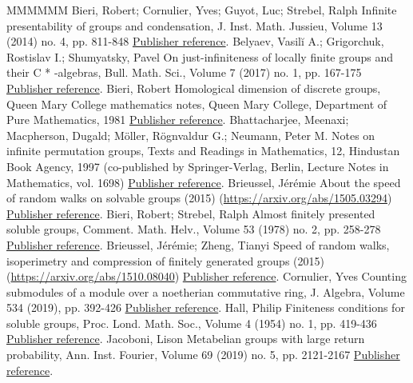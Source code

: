 \begin{thebibliography}{MMMMMM}
 Bieri, Robert; Cornulier, Yves; Guyot, Luc; Strebel, Ralph Infinite presentability of groups and condensation, J. Inst. Math. Jussieu, Volume 13 (2014) no. 4, pp. 811-848 \href{https://ahl.centre-mersenne.org/item/AHL_2020__3__981_0/#BCGS}{Publisher reference}.
 Belyaev, Vasilĭ A.; Grigorchuk, Rostislav I.; Shumyatsky, Pavel On just-infiniteness of locally finite groups and their C * -algebras, Bull. Math. Sci., Volume 7 (2017) no. 1, pp. 167-175 \href{https://ahl.centre-mersenne.org/item/AHL_2020__3__981_0/#BGS}{Publisher reference}.
 Bieri, Robert Homological dimension of discrete groups, Queen Mary College mathematics notes, Queen Mary College, Department of Pure Mathematics, 1981 \href{https://ahl.centre-mersenne.org/item/AHL_2020__3__981_0/#B}{Publisher reference}.
 Bhattacharjee, Meenaxi; Macpherson, Dugald; Möller, Rögnvaldur G.; Neumann, Peter M. Notes on infinite permutation groups, Texts and Readings in Mathematics, 12, Hindustan Book Agency, 1997 (co-published by Springer-Verlag, Berlin, Lecture Notes in Mathematics, vol. 1698) \href{https://ahl.centre-mersenne.org/item/AHL_2020__3__981_0/#perms}{Publisher reference}.
 Brieussel, Jérémie About the speed of random walks on solvable groups (2015) (\url{https://arxiv.org/abs/1505.03294}) \href{https://ahl.centre-mersenne.org/item/AHL_2020__3__981_0/#Brieussel}{Publisher reference}.
 Bieri, Robert; Strebel, Ralph Almost finitely presented soluble groups, Comment. Math. Helv., Volume 53 (1978) no. 2, pp. 258-278 \href{https://ahl.centre-mersenne.org/item/AHL_2020__3__981_0/#BS}{Publisher reference}.
 Brieussel, Jérémie; Zheng, Tianyi Speed of random walks, isoperimetry and compression of finitely generated groups (2015) (\url{https://arxiv.org/abs/1510.08040}) \href{https://ahl.centre-mersenne.org/item/AHL_2020__3__981_0/#BZ}{Publisher reference}.
 Cornulier, Yves Counting submodules of a module over a noetherian commutative ring, J. Algebra, Volume 534 (2019), pp. 392-426 \href{https://ahl.centre-mersenne.org/item/AHL_2020__3__981_0/#Cor18}{Publisher reference}.
 Hall, Philip Finiteness conditions for soluble groups, Proc. Lond. Math. Soc., Volume 4 (1954) no. 1, pp. 419-436 \href{https://ahl.centre-mersenne.org/item/AHL_2020__3__981_0/#Hall54}{Publisher reference}.
 Jacoboni, Lison Metabelian groups with large return probability, Ann. Inst. Fourier, Volume 69 (2019) no. 5, pp. 2121-2167 \href{https://ahl.centre-mersenne.org/item/AHL_2020__3__981_0/#J}{Publisher reference}.

\end{thebibliography}
